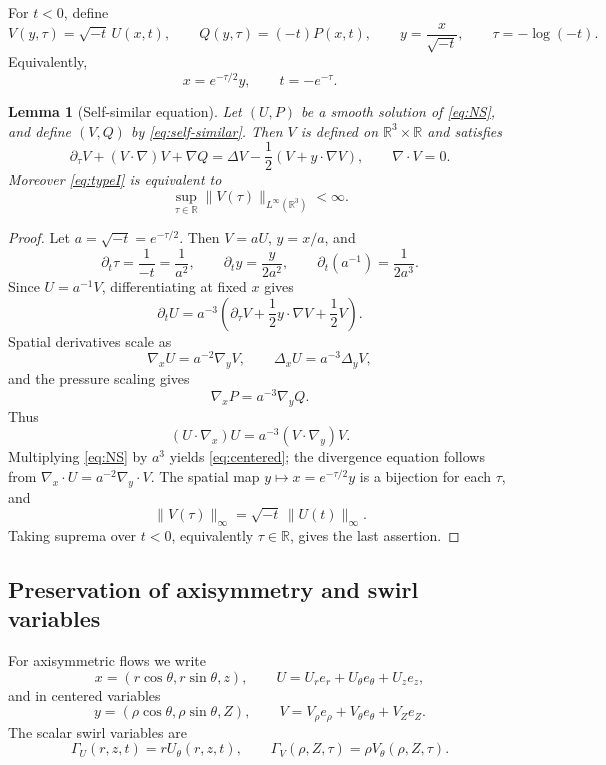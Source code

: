\documentclass[11pt]{amsart}
\theoremstyle{plain}
\newtheorem{lemma}[theorem]{Lemma}
\theoremstyle{definition}
\theoremstyle{remark}
\numberwithin{equation}{section}
\begin{document}
For \(t<0\), define
\begin{equation}\label{eq:self-similar}
   V(y,\tau)=\sqrt{-t}\,U(x,t),\qquad
   Q(y,\tau)=(-t)P(x,t),\qquad
   y=\frac{x}{\sqrt{-t}},\qquad
   \tau=-\log(-t).
\end{equation}
Equivalently,
\[
   x=e^{-\tau/2}y,\qquad t=-e^{-\tau}.
\]

\begin{lemma}[Self-similar equation]\label{lem:self-similar-equation}
Let \((U,P)\) be a smooth solution of \eqref{eq:NS}, and define \((V,Q)\) by
\eqref{eq:self-similar}.  Then \(V\) is defined on
\(\mathbb R^3\times\mathbb R\) and satisfies
\begin{equation}\label{eq:centered}
   \partial_\tau V+(V\cdot\nabla)V+\nabla Q
   =
   \Delta V-\frac12(V+y\cdot\nabla V),
   \qquad \nabla\cdot V=0.
\end{equation}
Moreover \eqref{eq:typeI} is equivalent to
\[
   \sup_{\tau\in\mathbb R}
   \|V(\tau)\|_{L^\infty(\mathbb R^3)}<\infty .
\]
\end{lemma}

\begin{proof}
Let \(a=\sqrt{-t}=e^{-\tau/2}\).  Then \(V=aU\), \(y=x/a\), and
\[
   \partial_t\tau=\frac1{-t}=\frac1{a^2},
   \qquad
   \partial_t y=\frac{y}{2a^2},
   \qquad
   \partial_t(a^{-1})=\frac1{2a^3}.
\]
Since \(U=a^{-1}V\), differentiating at fixed \(x\) gives
\[
   \partial_tU
   =
   a^{-3}
   \left(
      \partial_\tau V+\frac12 y\cdot\nabla V+\frac12V
   \right).
\]
Spatial derivatives scale as
\[
   \nabla_xU=a^{-2}\nabla_yV,\qquad
   \Delta_xU=a^{-3}\Delta_yV,
\]
and the pressure scaling gives
\[
   \nabla_xP=a^{-3}\nabla_yQ.
\]
Thus
\[
   (U\cdot\nabla_x)U=a^{-3}(V\cdot\nabla_y)V.
\]
Multiplying \eqref{eq:NS} by \(a^3\) yields \eqref{eq:centered}; the
divergence equation follows from
\(\nabla_x\cdot U=a^{-2}\nabla_y\cdot V\).  The spatial map
\(y\mapsto x=e^{-\tau/2}y\) is a bijection for each \(\tau\), and
\[
   \|V(\tau)\|_\infty
   =
   \sqrt{-t}\,\|U(t)\|_\infty .
\]
Taking suprema over \(t<0\), equivalently \(\tau\in\mathbb R\), gives the
last assertion.
\end{proof}

\subsection{Preservation of axisymmetry and swirl variables}

For axisymmetric flows we write
\[
   x=(r\cos\theta,r\sin\theta,z),\qquad
   U=U_re_r+U_\theta e_\theta+U_ze_z,
\]
and in centered variables
\[
   y=(\rho\cos\theta,\rho\sin\theta,Z),\qquad
   V=V_\rho e_\rho+V_\theta e_\theta+V_Ze_Z.
\]
The scalar swirl variables are
\[
   \Gamma_U(r,z,t)=rU_\theta(r,z,t),\qquad
   \Gamma_V(\rho,Z,\tau)=\rho V_\theta(\rho,Z,\tau).
\]
\end{document}
